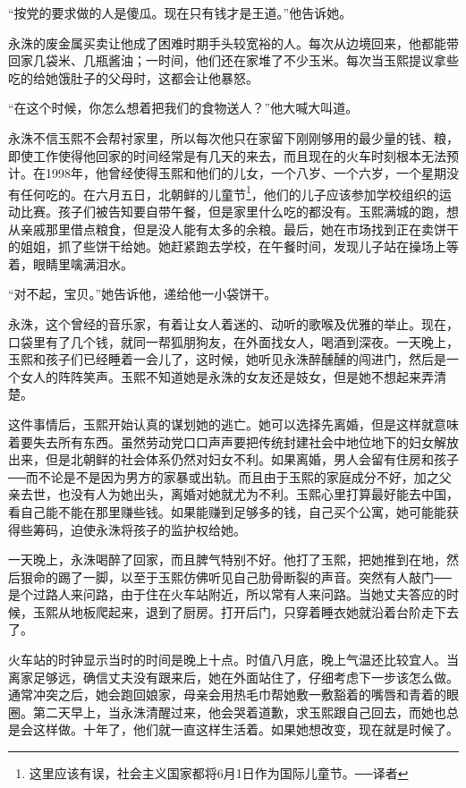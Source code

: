 “按党的要求做的人是傻瓜。现在只有钱才是王道。”他告诉她。

永洙的废金属买卖让他成了困难时期手头较宽裕的人。每次从边境回来，他都能带回家几袋米、几瓶酱油；一时间，他们还在家堆了不少玉米。每次当玉熙提议拿些吃的给她饿肚子的父母时，这都会让他暴怒。

“在这个时候，你怎么想着把我们的食物送人？”他大喊大叫道。

永洙不信玉熙不会帮衬家里，所以每次他只在家留下刚刚够用的最少量的钱、粮，即使工作使得他回家的时间经常是有几天的来去，而且现在的火车时刻根本无法预计。在1998年，他曾经使得玉熙和他们的儿女，一个八岁、一个六岁，一个星期没有任何吃的。在六月五日，北朝鲜的儿童节\footnote{这里应该有误，社会主义国家都将6月1日作为国际儿童节。──译者}，他们的儿子应该参加学校组织的运动比赛。孩子们被告知要自带午餐，但是家里什么吃的都没有。玉熙满城的跑，想从亲戚那里借点粮食，但是没人能有太多的余粮。最后，她在市场找到正在卖饼干的姐姐，抓了些饼干给她。她赶紧跑去学校，在午餐时间，发现儿子站在操场上等着，眼睛里噙满泪水。

“对不起，宝贝。”她告诉他，递给他一小袋饼干。

永洙，这个曾经的音乐家，有着让女人着迷的、动听的歌喉及优雅的举止。现在，口袋里有了几个钱，就同一帮狐朋狗友，在外面找女人，喝酒到深夜。一天晚上，玉熙和孩子们已经睡着一会儿了，这时候，她听见永洙醉醺醺的闯进门，然后是一个女人的阵阵笑声。玉熙不知道她是永洙的女友还是妓女，但是她不想起来弄清楚。

这件事情后，玉熙开始认真的谋划她的逃亡。她可以选择先离婚，但是这样就意味着要失去所有东西。虽然劳动党口口声声要把传统封建社会中地位地下的妇女解放出来，但是北朝鲜的社会体系仍然对妇女不利。如果离婚，男人会留有住房和孩子──而不论是不是因为男方的家暴或出轨。而且由于玉熙的家庭成分不好，加之父亲去世，也没有人为她出头，离婚对她就尤为不利。玉熙心里打算最好能去中国，看自己能不能在那里赚些钱。如果能赚到足够多的钱，自己买个公寓，她可能能获得些筹码，迫使永洙将孩子的监护权给她。

一天晚上，永洙喝醉了回家，而且脾气特别不好。他打了玉熙，把她推到在地，然后狠命的踢了一脚，以至于玉熙仿佛听见自己肋骨断裂的声音。突然有人敲门──是个过路人来问路，由于住在火车站附近，所以常有人来问路。当她丈夫答应的时候，玉熙从地板爬起来，退到了厨房。打开后门，只穿着睡衣她就沿着台阶走下去了。

火车站的时钟显示当时的时间是晚上十点。时值八月底，晚上气温还比较宜人。当离家足够远，确信丈夫没有跟来后，她在外面站住了，仔细考虑下一步该怎么做。通常冲突之后，她会跑回娘家，母亲会用热毛巾帮她敷一敷豁着的嘴唇和青着的眼圈。第二天早上，当永洙清醒过来，他会哭着道歉，求玉熙跟自己回去，而她也总是会这样做。十年了，他们就一直这样生活着。如果她想改变，现在就是时候了。

